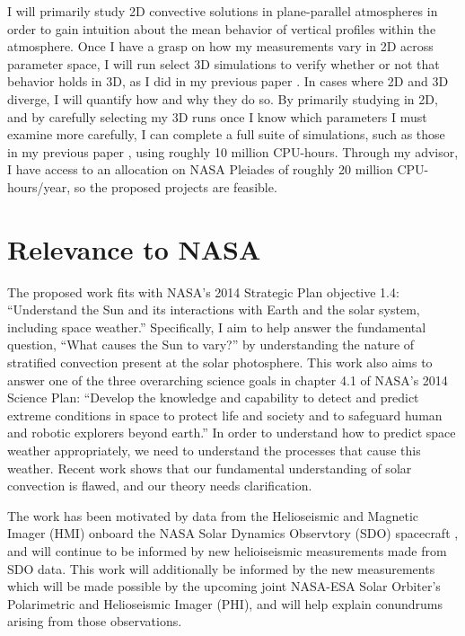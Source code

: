 \documentclass[aasms,12pt]{article}
\begin{document}
I will primarily study 2D convective solutions in plane-parallel atmospheres in order to gain
intuition about the mean behavior of vertical profiles within the atmosphere.  Once I have a grasp
on how my measurements vary in 2D across parameter space, I will run select 3D simulations to
verify whether or not that behavior holds in 3D, as I did in my previous paper \citep{anders&brown2017}.
In cases where 2D and 3D diverge, I will quantify how and why they do so.
By primarily studying in 2D, and by carefully
selecting my 3D runs once I know which parameters I must examine more carefully, I can complete
a full suite of simulations, such as those in my previous paper \citep{anders&brown2017}, using
roughly 10 million CPU-hours.  Through my advisor, I have access to an allocation on NASA Pleiades
of roughly 20 million CPU-hours/year, so the proposed projects are feasible.




\section{Relevance to NASA} 
The proposed work fits with NASA's 2014 Strategic Plan objective
1.4:
``Understand the Sun and its interactions with Earth and the solar
system, including space weather.''  Specifically, I aim to help answer
the fundamental question, ``What causes the Sun to vary?'' by understanding
the nature of stratified convection present at the solar photosphere.
This work also aims to answer one of the three overarching science goals
in chapter 4.1 of NASA's 2014 Science Plan: 
``Develop the
knowledge and capability to detect and predict extreme conditions in space to
protect life and society and to safeguard human and robotic explorers beyond
earth.'' In order to understand how to predict space weather appropriately, we
need to understand the processes that cause this weather.  Recent work
shows that our fundamental understanding of solar convection is flawed, and our theory needs
clarification.

The work has been motivated by data from the Helioseismic and Magnetic Imager (HMI) onboard
the NASA Solar Dynamics Observtory (SDO) spacecraft 
\citep{hanasoge&all2012, greer&all2015, hathaway&all2015}, and will continue to be informed by
new helioiseismic measurements made from SDO data. This work will additionally be informed
by the new measurements which will
be made possible by the upcoming joint NASA-ESA Solar Orbiter's Polarimetric and 
Helioseismic Imager (PHI), and will help explain conundrums arising from those observations.
\end{document}
